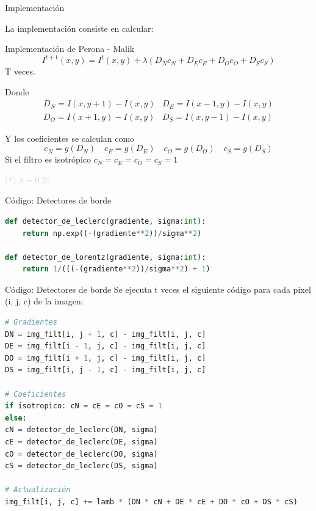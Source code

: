\documentclass{beamer}
\begin{document}
\begin{frame}[fragile]{Implementación}
	\justifying
	
	La implementación consiste en calcular:
	
	\begin{block}{Implementación de Perona - Malik}
		\[
		I^{t+1}(x,y) = I^t(x,y) + \lambda (D_N c_N + D_E c_E + D_O c_O + D_S c_S)
		\]
		T veces.
	\end{block}
	
	\begin{block}{Donde}
		\[
		\begin{array}{cc}
			D_N = I(x, y+1) - I(x, y) & D_E = I(x-1, y) - I(x, y) \\[0.4em]
			D_O = I(x+1, y) - I(x, y) & D_S = I(x, y-1) - I(x, y)
		\end{array}
		\]
	\end{block}
	
	\begin{block}{Y los coeficientes se calculan como}
		\[
		c_N = g(D_N) \quad c_E = g(D_E) \quad c_O = g(D_O) \quad c_S = g(D_S)
		\]
		Si el filtro es isotrópico $c_N = c_E = c_O = c_S = 1$
	\end{block}

	\vfill
	\footnotesize \textcolor{lightgray}{(*) $\lambda = 0.25$}
\end{frame}

\begin{frame}[fragile]{Código: Detectores de borde}
	\justifying
	
	\begin{lstlisting}[language=Python]
def detector_de_leclerc(gradiente, sigma:int):
	return np.exp((-(gradiente**2))/sigma**2)

def detector_de_lorentz(gradiente, sigma:int):
	return 1/(((-(gradiente**2))/sigma**2) + 1)
	\end{lstlisting}
\end{frame}

\begin{frame}[fragile]{Código: Detectores de borde}
	\justifying
	Se ejecuta t veces el siguiente código para cada pixel (i, j, c) de la imagen:
	\begin{lstlisting}[language=Python]
# Gradientes
DN = img_filt[i, j + 1, c] - img_filt[i, j, c]
DE = img_filt[i - 1, j, c] - img_filt[i, j, c]
DO = img_filt[i + 1, j, c] - img_filt[i, j, c]
DS = img_filt[i, j - 1, c] - img_filt[i, j, c]

# Coeficientes
if isotropico: cN = cE = cO = cS = 1
else:
cN = detector_de_leclerc(DN, sigma)
cE = detector_de_leclerc(DE, sigma)
cO = detector_de_leclerc(DO, sigma)
cS = detector_de_leclerc(DS, sigma)

# Actualización
img_filt[i, j, c] += lamb * (DN * cN + DE * cE + DO * cO + DS * cS)
	\end{lstlisting}
\end{frame}
\end{document}
